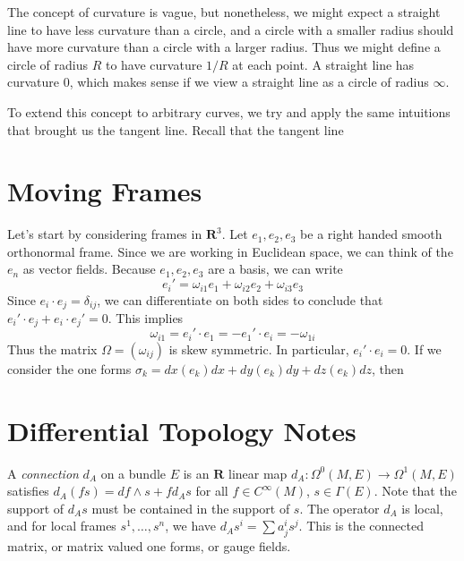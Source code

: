 The concept of curvature is vague, but nonetheless, we might expect a straight line to have less curvature than a circle, and a circle with a smaller radius should have more curvature than a circle with a larger radius. Thus we might define a circle of radius $R$ to have curvature $1/R$ at each point. A straight line has curvature $0$, which makes sense if we view a straight line as a circle of radius $\infty$.

To extend this concept to arbitrary curves, we try and apply the same intuitions that brought us the tangent line. Recall that the tangent line 




\chapter{Moving Frames}

Let's start by considering frames in $\mathbf{R}^3$. Let $e_1, e_2, e_3$ be a right handed smooth orthonormal frame. Since we are working in Euclidean space, we can think of the $e_n$ as vector fields. Because $e_1, e_2, e_3$ are a basis, we can write
%
\[ e_i' = \omega_{i1} e_1 + \omega_{i2} e_2 + \omega_{i3} e_3 \]
%
Since $e_i \cdot e_j = \delta_{ij}$, we can differentiate on both sides to conclude that $e_i' \cdot e_j + e_i \cdot e_j' = 0$. This implies
%
\[ \omega_{i1} = e_i' \cdot e_1 = - e_1' \cdot e_i = - \omega_{1i} \]
%
Thus the matrix $\Omega = (\omega_{ij})$ is skew symmetric. In particular, $e_i' \cdot e_i = 0$. If we consider the one forms $\sigma_k = dx(e_k) dx + dy(e_k) dy + dz(e_k) dz$, then











\chapter{Differential Topology Notes}

A \emph{connection} $d_A$ on a bundle $E$ is an $\mathbf{R}$ linear map $d_A: \Omega^0(M,E) \to \Omega^1(M,E)$ satisfies $d_A(fs) = df \wedge s + f d_A s$ for all $f \in C^\infty(M)$, $s \in \Gamma(E)$. Note that the support of $d_A s$ must be contained in the support of $s$. The operator $d_A$ is local, and for local frames $s^1, \dots, s^n$, we have $d_A s^i = \sum a_j^i s^j$. This is the connected matrix, or matrix valued one forms, or gauge fields.


